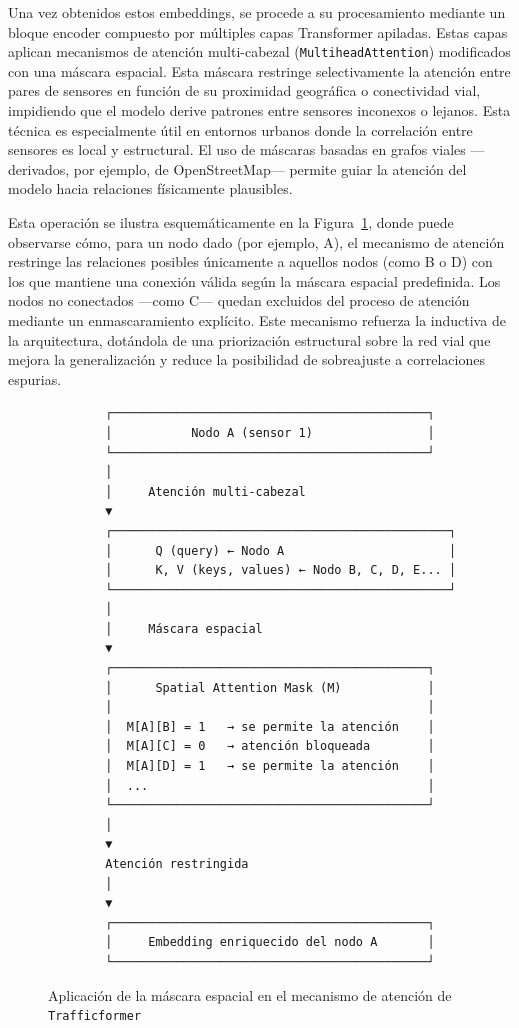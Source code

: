 Una vez obtenidos estos embeddings, se procede a su procesamiento mediante un bloque encoder compuesto por múltiples capas Transformer apiladas. Estas capas aplican mecanismos de atención multi-cabezal (\texttt{MultiheadAttention}) modificados con una máscara espacial. Esta máscara restringe selectivamente la atención entre pares de sensores en función de su proximidad geográfica o conectividad vial, impidiendo que el modelo derive patrones entre sensores inconexos o lejanos. Esta técnica es especialmente útil en entornos urbanos donde la correlación entre sensores es local y estructural. El uso de máscaras basadas en grafos viales —derivados, por ejemplo, de OpenStreetMap— permite guiar la atención del modelo hacia relaciones físicamente plausibles.

Esta operación se ilustra esquemáticamente en la Figura~\ref{fig:attention_masking}, donde puede observarse cómo, para un nodo dado (por ejemplo, A), el mecanismo de atención restringe las relaciones posibles únicamente a aquellos nodos (como B o D) con los que mantiene una conexión válida según la máscara espacial predefinida. Los nodos no conectados —como C— quedan excluidos del proceso de atención mediante un enmascaramiento explícito. Este mecanismo refuerza la inductiva de la arquitectura, dotándola de una priorización estructural sobre la red vial que mejora la generalización y reduce la posibilidad de sobreajuste a correlaciones espurias.

\begin{figure}[H]
	\centering
	\caption{Aplicación de la máscara espacial en el mecanismo de atención de \texttt{Trafficformer}}
	\label{fig:attention_masking}
	\begin{verbatim}
		┌────────────────────────────────────────────┐
		│           Nodo A (sensor 1)                │
		└────────────────────────────────────────────┘
		│
		│     Atención multi-cabezal
		▼
		┌───────────────────────────────────────────────┐
		│      Q (query) ← Nodo A                       │
		│      K, V (keys, values) ← Nodo B, C, D, E... │
		└───────────────────────────────────────────────┘
		│
		│     Máscara espacial
		▼
		┌────────────────────────────────────────────┐
		│      Spatial Attention Mask (M)            │
		│                                            │
		│  M[A][B] = 1   → se permite la atención    │
		│  M[A][C] = 0   → atención bloqueada        │
		│  M[A][D] = 1   → se permite la atención    │
		│  ...                                       │
		└────────────────────────────────────────────┘
		│
		▼
		Atención restringida
		│
		▼
		┌────────────────────────────────────────────┐
		│     Embedding enriquecido del nodo A       │
		└────────────────────────────────────────────┘
	\end{verbatim}
\end{figure}

